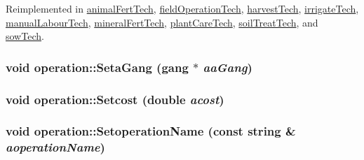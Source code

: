 Reimplemented in \hyperlink{classanimal_fert_tech_ace0ed6c38236d05cd521f98624431767}{animalFertTech}, \hyperlink{classfield_operation_tech_a2a2c416f3f3fe8ceb2f1f1b63c149a09}{fieldOperationTech}, \hyperlink{classharvest_tech_a8b2a5efa11d4ee3355c75cec9a080b27}{harvestTech}, \hyperlink{classirrigate_tech_a8c7f11f2ce9cb7e19851c81c69c91d0a}{irrigateTech}, \hyperlink{classmanual_labour_tech_a1b03a5bb1d552a3bacaeb5bb758a1e17}{manualLabourTech}, \hyperlink{classmineral_fert_tech_a25acfef0b5b6f2a6463fe9249d13cb9a}{mineralFertTech}, \hyperlink{classplant_care_tech_ac699023786b1759775d57e80b5817096}{plantCareTech}, \hyperlink{classsoil_treat_tech_a43342c7563137af6f07fd4b031f3c599}{soilTreatTech}, and \hyperlink{classsow_tech_aa606f377adfc0cf3fd80d96ba2576fcc}{sowTech}.\hypertarget{classoperation_ab3b3f3d4b1b02e1928e25704f49ba92d}{
\subsubsection[{SetaGang}]{\setlength{\rightskip}{0pt plus 5cm}void operation::SetaGang ({\bf gang} $\ast$ {\em aaGang})}}
\label{classoperation_ab3b3f3d4b1b02e1928e25704f49ba92d}
\hypertarget{classoperation_a7b792e8cf800cf57e5911bc9b88709fe}{
\subsubsection[{Setcost}]{\setlength{\rightskip}{0pt plus 5cm}void operation::Setcost (double {\em acost})}}
\label{classoperation_a7b792e8cf800cf57e5911bc9b88709fe}
\hypertarget{classoperation_a17112149ad62968d66e8beb3eaf22dee}{
\subsubsection[{SetoperationName}]{\setlength{\rightskip}{0pt plus 5cm}void operation::SetoperationName (const string \& {\em aoperationName})}}
\label{classoperation_a17112149ad62968d66e8beb3eaf22dee}
